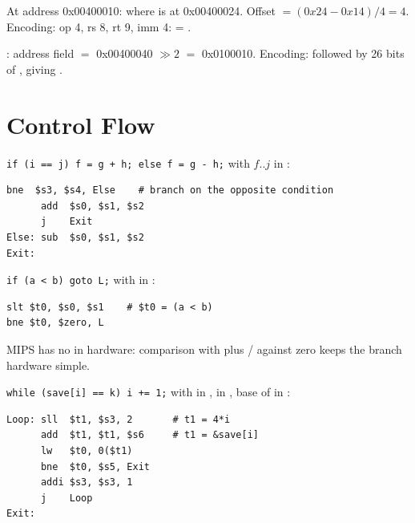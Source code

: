 \begin{example}
At address 0x00400010:  where  is at
0x00400024. Offset $= (0x24 - 0x14)/4 = 4$. Encoding: op 4, rs 8, rt 9,
imm 4:  = .
\end{example}

\begin{example}
: address field $=$ 0x00400040 $\gg 2$ $=$ 0x0100010.
Encoding:  followed by 26 bits of , giving
.
\end{example}

\section{Control Flow}

\begin{example}
\lstinline[style=c]|if (i == j) f = g + h; else f = g - h;| with
$f..j$ in :
\begin{lstlisting}[style=mips]
      bne  $s3, $s4, Else    # branch on the opposite condition
      add  $s0, $s1, $s2
      j    Exit
Else: sub  $s0, $s1, $s2
Exit:
\end{lstlisting}
\end{example}

\begin{example}
\lstinline[style=c]|if (a < b) goto L;| with  in :
\begin{lstlisting}[style=mips]
slt $t0, $s0, $s1    # $t0 = (a < b)
bne $t0, $zero, L
\end{lstlisting}
MIPS has no  in hardware: comparison with  plus
/ against zero keeps the branch hardware simple.
\end{example}

\begin{example}
\lstinline[style=c]|while (save[i] == k) i += 1;| with  in
,  in , base of  in :
\begin{lstlisting}[style=mips]
Loop: sll  $t1, $s3, 2       # t1 = 4*i
      add  $t1, $t1, $s6     # t1 = &save[i]
      lw   $t0, 0($t1)
      bne  $t0, $s5, Exit
      addi $s3, $s3, 1
      j    Loop
Exit:
\end{lstlisting}
\end{example}

